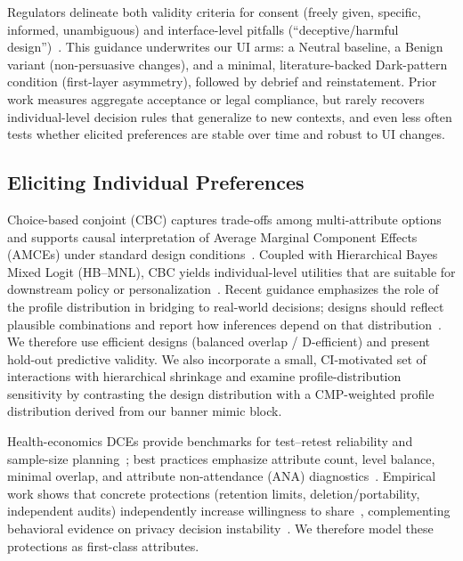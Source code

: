 \documentclass{eusset}
\begin{document}
Regulators delineate both validity criteria for consent (freely given, specific, informed, unambiguous) and interface-level pitfalls (``deceptive/harmful design'')~\citep{EDPB2020Consent,EDPB2023DarkPatterns,ICO_CMA_2023_HarmfulDesign,FTC2022DarkPatterns,CPPA2024Advisory}. This guidance underwrites our UI arms: a Neutral baseline, a Benign variant (non-persuasive changes), and a minimal, literature-backed Dark-pattern condition (first-layer asymmetry), followed by debrief and reinstatement. Prior work measures aggregate acceptance or legal compliance, but rarely recovers individual-level decision rules that generalize to new contexts, and even less often tests whether elicited preferences are stable over time and robust to UI changes. 

\subsection{Eliciting Individual Preferences}
\label{subsec:dce}
Choice-based conjoint (CBC) captures trade-offs among multi-attribute options and supports causal interpretation of Average Marginal Component Effects (AMCEs) under standard design conditions~\citep{Hainmueller2014ConjointID}. Coupled with Hierarchical Bayes Mixed Logit (HB--MNL), CBC yields individual-level utilities that are suitable for downstream policy or personalization~\citep{Train2009DCMS}. Recent guidance emphasizes the role of the profile distribution in bridging to real-world decisions; designs should reflect plausible combinations and report how inferences depend on that distribution~\citep{de2022improving}. We therefore use efficient designs (balanced overlap / D-efficient) and present hold-out predictive validity. We also incorporate a small, CI-motivated set of interactions with hierarchical shrinkage and examine profile-distribution sensitivity by contrasting the design distribution with a CMP-weighted profile distribution derived from our banner mimic block.

Health-economics DCEs provide benchmarks for test--retest reliability and sample-size planning~\citep{deBekkerGrob2015SampleSize,Gamper2018TestRetestDCE}; best practices emphasize attribute count, level balance, minimal overlap, and attribute non-attendance (ANA) diagnostics~\citep{Sawtooth2021CBCRules,bliemer2024designing,HessHensher2010ANA}. Empirical work shows that concrete protections (retention limits, deletion/portability, independent audits) independently increase willingness to share~\citep{Gupta2023ConsumerViewsJAMA}, complementing behavioral evidence on privacy decision instability~\citep{Acquisti2015HumanBehavior}. We therefore model these protections as first-class attributes.
\end{document}
